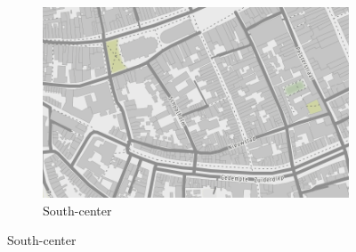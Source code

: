 \begin{figure}[htbp]
\begin{subfigure}{.5\textwidth}
\includegraphics[width=\linewidth]{../experiments/GroteMarktMaps/maps/zuidCentrum.png}
\caption{South-center}
\end{subfigure}


\end{figure}
